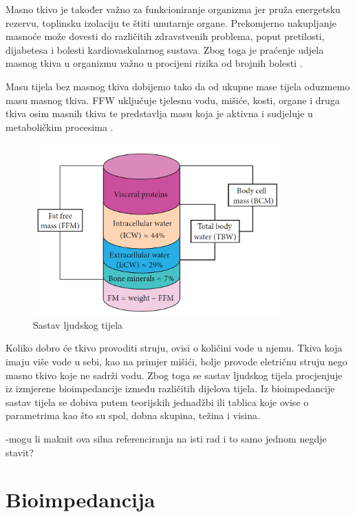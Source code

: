 \documentclass[../diplomski_rad.tex]{subfiles}
\begin{document}
Masno tkivo je također važno za funkcioniranje organizma jer pruža energetsku rezervu, toplinsku izolaciju te štiti unutarnje organe. 
Prekomjerno nakupljanje masnoće može dovesti do različitih zdravstvenih problema, poput pretilosti, dijabetesa i 
bolesti kardiovaskularnog sustava. 
Zbog toga je praćenje udjela masnog tkiva u organizmu važno u procijeni rizika od brojnih bolesti \cite{Bera2014}.

Masu tijela bez masnog tkiva dobijemo tako da od ukupne mase tijela oduzmemo masu masnog tkiva. 
FFW uključuje tjelesnu vodu, mišiće, kosti, organe i druga tkiva osim masnih tkiva te predstavlja masu koja je aktivna i sudjeluje 
u metaboličkim procesima \cite{Bera2014}.

\begin{figure}[htb]
    \centering
    \includegraphics[width=0.85\textwidth]{Figures/sastav_tijela.png} 
    \caption{Sastav ljudskog tijela \cite{Bera2014}}
    \label{slk:sastav_tijela}
\end{figure}

Koliko dobro će tkivo provoditi struju, ovisi o količini vode u njemu. 
Tkiva koja imaju više vode u sebi, kao na primjer mišići, bolje provode eletričnu struju nego masno tkivo koje ne sadrži vodu. 
Zbog toga se sastav ljudskog tijela procjenjuje iz izmjerene bioimpedancije između različitih dijelova tijela. 
Iz bioimpedancije sastav tijela se dobiva putem teorijskih jednadžbi ili tablica koje ovise o parametrima 
kao što su spol, dobna skupina, težina i visina.

-mogu li maknit ova silna referenciranja na isti rad i to samo jednom negdje stavit?

\section{Bioimpedancija}
\end{document}
